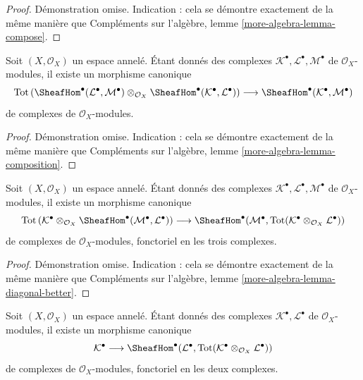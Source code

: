 \begin{proof}
Démonstration omise. Indication : cela se démontre exactement de la même manière que Compléments sur l'algèbre, lemme \ref{more-algebra-lemma-compose}.
\end{proof}

\begin{lemma}

\label{lemma-composition}
Soit $(X, \mathcal{O}_X)$ un espace annelé. Étant donnés des complexes $\mathcal{K}^\bullet, \mathcal{L}^\bullet, \mathcal{M}^\bullet$ de $\mathcal{O}_X$-modules, il existe un morphisme canonique $$
\text{Tot}\left(
\SheafHom^\bullet(\mathcal{L}^\bullet, \mathcal{M}^\bullet)
\otimes_{\mathcal{O}_X}
\SheafHom^\bullet(\mathcal{K}^\bullet, \mathcal{L}^\bullet)
\right)
\longrightarrow
\SheafHom^\bullet(\mathcal{K}^\bullet, \mathcal{M}^\bullet)
$$ de complexes de $\mathcal{O}_X$-modules.
\end{lemma}

\begin{proof}
Démonstration omise. Indication : cela se démontre exactement de la même manière que Compléments sur l'algèbre, lemme \ref{more-algebra-lemma-composition}.
\end{proof}

\begin{lemma}

\label{lemma-diagonal-better}

Soit $(X, \mathcal{O}_X)$ un espace annelé. Étant donnés des complexes
$\mathcal{K}^\bullet, \mathcal{L}^\bullet, \mathcal{M}^\bullet$
de $\mathcal{O}_X$-modules, il existe un morphisme canonique
$$
\text{Tot}\left(
\mathcal{K}^\bullet \otimes_{\mathcal{O}_X}
\SheafHom^\bullet(\mathcal{M}^\bullet, \mathcal{L}^\bullet)
\right)
\longrightarrow
\SheafHom^\bullet(\mathcal{M}^\bullet,
\text{Tot}(\mathcal{K}^\bullet \otimes_{\mathcal{O}_X} \mathcal{L}^\bullet))
$$
de complexes de $\mathcal{O}_X$-modules, fonctoriel en les trois complexes.

\end{lemma}

\begin{proof}
Démonstration omise. Indication : cela se démontre exactement de la même manière que Compléments sur l'algèbre, lemme \ref{more-algebra-lemma-diagonal-better}.
\end{proof}

\begin{lemma}

\label{lemma-diagonal}

Soit $(X, \mathcal{O}_X)$ un espace annelé. Étant donnés des complexes
$\mathcal{K}^\bullet, \mathcal{L}^\bullet$
de $\mathcal{O}_X$-modules, il existe un morphisme canonique
$$
\mathcal{K}^\bullet
\longrightarrow
\SheafHom^\bullet(\mathcal{L}^\bullet,
\text{Tot}(\mathcal{K}^\bullet \otimes_{\mathcal{O}_X} \mathcal{L}^\bullet))
$$
de complexes de $\mathcal{O}_X$-modules, fonctoriel en les deux complexes.

\end{lemma}

